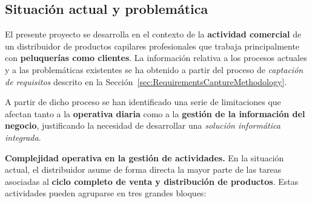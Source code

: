 \subsection{Situación actual y problemática}

El presente proyecto se desarrolla en el contexto de la \textbf{actividad comercial} de un distribuidor de productos capilares profesionales que trabaja principalmente con \textbf{peluquerías como clientes}. La información relativa a los procesos actuales y a las problemáticas existentes se ha obtenido a partir del proceso de \textit{captación de requisitos} descrito en la Sección~\ref{sec:RequirementsCaptureMethodology}.

A partir de dicho proceso se han identificado una serie de limitaciones que afectan tanto a la \textbf{operativa diaria} como a la \textbf{gestión de la información del negocio}, justificando la necesidad de desarrollar una \textit{solución informática integrada}.

\noindent\textbf{Complejidad operativa en la gestión de actividades.} En la situación actual, el distribuidor asume de forma directa la mayor parte de las tareas asociadas al \textbf{ciclo completo de venta y distribución de productos}. Estas actividades pueden agruparse en tres grandes bloques:


